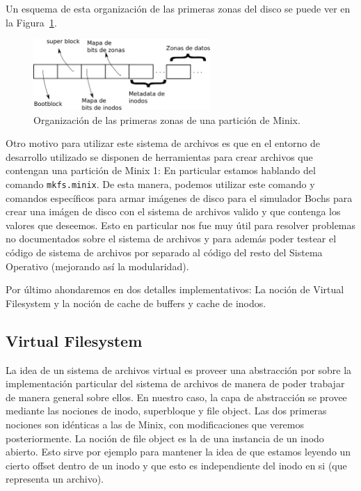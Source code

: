 Un esquema de esta organizaci\'on de las primeras zonas del disco se puede ver en la Figura~\ref{fig::superblock}.

\begin{figure}[H]
	\caption{Organizaci\'on de las primeras zonas de una partici\'on de Minix.}
	\label{fig::superblock}
	\centering
	\includegraphics[width=0.6\textwidth]{superblock.png}
\end{figure} 

Otro motivo para utilizar este sistema de archivos es que en el entorno de desarrollo utilizado se disponen de herramientas para crear archivos
que contengan una partici\'on de Minix 1: En particular estamos hablando del comando \texttt{mkfs.minix}. De esta manera, podemos utilizar 
este comando y comandos espec\'ificos para armar im\'agenes de disco para el simulador Bochs para crear una im\'agen de disco con el sistema
de archivos valido y que contenga los valores que deseemos. Esto en particular nos fue muy \'util para resolver problemas no documentados sobre
el sistema de archivos y para adem\'as poder testear el c\'odigo de sistema de archivos por separado al c\'odigo del resto del Sistema Operativo
(mejorando as\'i la modularidad).

Por \'ultimo ahondaremos en dos detalles implementativos: La noci\'on de Virtual Filesystem y la noci\'on de cache de buffers y cache de
inodos.

\subsection{Virtual Filesystem}

La idea de un sistema de archivos virtual es proveer una abstracci\'on por sobre la implementaci\'on particular del sistema de archivos de
manera de poder trabajar de manera general sobre ellos. En nuestro caso, la capa de abstracci\'on se provee mediante las nociones de inodo,
superbloque y file object. Las dos primeras nociones son id\'enticas a las de Minix, con modificaciones que veremos posteriormente. La noci\'on
de file object es la de una instancia de un inodo abierto. Esto sirve por ejemplo para mantener la idea de que estamos leyendo un cierto offset dentro de un inodo y que esto es independiente del inodo en si (que representa un archivo).

